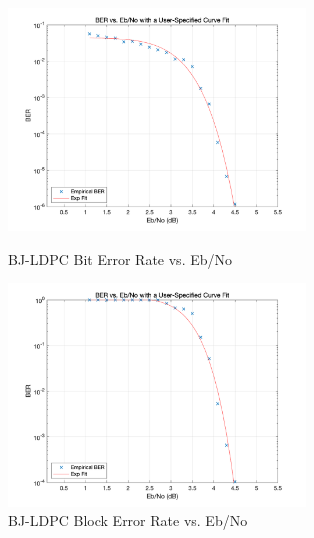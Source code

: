 \documentclass[lang=cn,11pt,a4paper,numbers]{elegantpaper}
\begin{document}
\begin{figure}[htbp]
    \begin{minipage}[t]{0.5\linewidth}
    \centering
    \includegraphics[width=3.1in]{figure/bj_bit_er.png}
    \caption{BJ-LDPC Bit Error Rate vs. Eb/No}
    \label{fig:bj_bit_er}
    \end{minipage}%
    \begin{minipage}[t]{0.5\linewidth}
    \centering
    \includegraphics[width=3.1in]{figure/bj_block_er.png}
    \caption{BJ-LDPC Block Error Rate vs. Eb/No}
    \label{fig:bj_block_er}
    \end{minipage}
    \end{figure}
\end{document}
